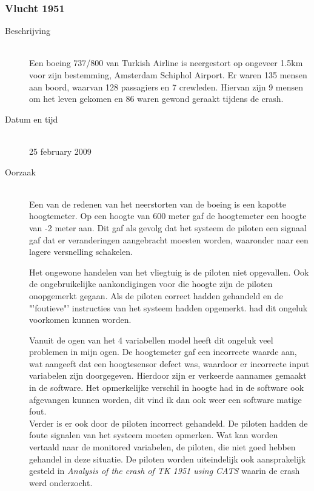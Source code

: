 \documentclass{article}%
\begin{document}
\clearpage %




\subsubsection{Vlucht 1951}
\begin{description}
\item [Beschrijving] \hfill \\
Een boeing 737/800 van Turkish Airline is neergestort op ongeveer 1.5km voor zijn bestemming, Amsterdam Schiphol Airport. Er waren 135 mensen aan boord, waarvan 128 passagiers en 7 crewleden. Hiervan zijn 9 mensen om het leven gekomen en 86 waren gewond geraakt tijdens de crash.
\item [Datum en tijd] \hfill \\
25 february 2009
\item [Oorzaak] \hfill \\
Een van de redenen van het neerstorten van de boeing is een kapotte hoogtemeter. Op een hoogte van 600 meter gaf de hoogtemeter een hoogte van -2 meter aan. Dit gaf als gevolg dat het systeem de piloten een signaal gaf dat er veranderingen aangebracht moesten worden, waaronder naar een lagere versnelling schakelen.

Het ongewone handelen van het vliegtuig is de piloten niet opgevallen. Ook de ongebruikelijke aankondigingen voor die hoogte zijn de piloten onopgemerkt gegaan. Als de piloten correct hadden gehandeld en de "'foutieve"' instructies van het systeem hadden opgemerkt. had dit ongeluk voorkomen kunnen worden.

Vanuit de ogen van het 4 variabellen model heeft dit ongeluk veel problemen in mijn ogen. De hoogtemeter gaf een incorrecte waarde aan, wat aangeeft dat een hoogtesensor defect was, waardoor er incorrecte input variabelen zijn doorgegeven. Hierdoor zijn er verkeerde aannames gemaakt in de software. Het opmerkelijke verschil in hoogte had in de software ook afgevangen kunnen worden, dit vind ik dan ook weer een software matige fout.\\
Verder is er ook door de piloten incorrect gehandeld. De piloten hadden de foute signalen van het systeem moeten opmerken. Wat kan worden vertaald naar de monitored variabelen, de piloten, die niet goed hebben gehandel in deze situatie. De piloten worden uiteindelijk ook aansprakelijk gesteld in \textit{Analysis of the crash of TK 1951 using CATS}\cite{crash1951tk} waarin de crash werd onderzocht.
\end{description}
\end{document}
